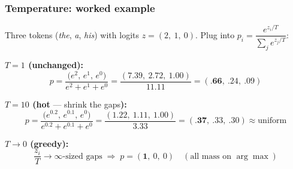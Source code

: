 \documentclass[aspectratio=169]{beamer}
\begin{document}
\begin{frame}
\frametitle{Temperature: worked example}

\vspace{0.1cm}
\begin{center}
\small Three tokens (\textit{the}, \textit{a}, \textit{his}) with logits $z = (2,\ 1,\ 0)$. Plug into $p_i = \dfrac{e^{z_i/T}}{\sum_j e^{z_j/T}}$:
\end{center}

\vspace{0.15cm}
\textcolor{popblue}{\textbf{$T = 1$ (unchanged):}}
\vspace{-0.2cm}
$$p = \frac{\big(e^{2},\, e^{1},\, e^{0}\big)}{e^{2}+e^{1}+e^{0}} = \frac{(7.39,\ 2.72,\ 1.00)}{11.11} = (\textbf{.66},\ .24,\ .09)$$

\textcolor{orange1}{\textbf{$T = 10$ (hot} --- shrink the gaps\textbf{):}}
\vspace{-0.2cm}
$$p = \frac{\big(e^{0.2},\, e^{0.1},\, e^{0}\big)}{e^{0.2}+e^{0.1}+e^{0}} = \frac{(1.22,\ 1.11,\ 1.00)}{3.33} = (\textbf{.37},\ .33,\ .30) \approx \text{uniform}$$

\textcolor{sampred}{\textbf{$T \to 0$ (greedy):}}
\vspace{-0.2cm}
$$\frac{z_i}{T} \to \infty\text{-sized gaps} \;\Rightarrow\; p = (\textbf{1},\ 0,\ 0) \quad(\text{all mass on } \arg\max)$$

\vspace{0.1cm}
\begin{center}
\end{center}
\end{frame}
\end{document}
